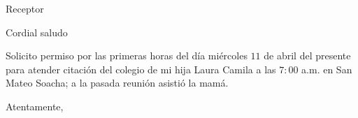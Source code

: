 \documentclass[letterpaper,spanish,11pt]{letter}
\begin{document}
\begin{letter}{Receptor}
	
\opening{Cordial saludo}

Solicito permiso por las primeras horas del día miércoles $11$ de abril del presente para atender citación del colegio de mi hija Laura Camila a las $7:00$ a.m. en San Mateo Soacha; a la pasada reunión asistió la mamá.

\closing{Atentamente,}


\end{letter}
\end{document}
